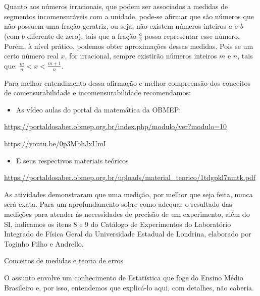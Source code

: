 Quanto aos números irracionais, que podem ser associados a medidas de segmentos incomensuráveis com a unidade, pode-se afirmar que são números que não possuem uma fração geratriz, ou seja, não existem números inteiros $a$ e $b$ (com $b$ diferente de zero), tais que a fração $\displaystyle\frac{a}{b}$ possa representar esse número. Porém, à nível prático, podemos obter aproximações dessas medidas. Pois se um certo número real $x$, for irracional, sempre existirão números inteiros $m$ e $n$, tais que: $\displaystyle\frac{m}{n}<x<\frac{m+1}{n}$.


\know{}
\label{\detokenize{NO103-5:para-saber-mais}}
Para melhor entendimento dessa afirmação e melhor compreensão dos conceitos de comensurabilidade e incomensurabilidade recomendamos:
\begin{itemize}
\item {} 
As vídeo aulas do portal da matemática da OBMEP:

\end{itemize}

\url{https://portaldosaber.obmep.org.br/index.php/modulo/ver?modulo=10}

\url{https://youtu.be/0p3MbhJxUmI}
\begin{itemize}
\item {} 
E seus respectivos materiais teóricos

\end{itemize}

\url{https://portaldosaber.obmep.org.br/uploads/material\_teorico/1tdgpkl7nmtk.pdf}

As atividades demonstraram que uma medição, por melhor que seja feita, nunca será exata. Para um aprofundamento sobre como adequar o resultado das medições para atender às necessidades de precisão de um experimento, além do SI, indicamos os itens 8 e 9 do Catálogo de Experimentos do Laboratório Integrado de Física Geral da Universidade Estadual de Londrina, elaborado por Toginho Filho e Andrello.

\href{http://www.uel.br/pessoal/inocente/pages/arquivos/03-Conceitos\%20de\%20medidas\%20e\%20teoria\%20de\%20erros.pdf}{Conceitos de medidas e teoria de erros}

O assunto envolve um conhecimento de Estatística que foge do Ensino Médio Brasileiro e, por isso, entendemos que explicá-lo aqui, com detalhes, não caberia.


\exercise

